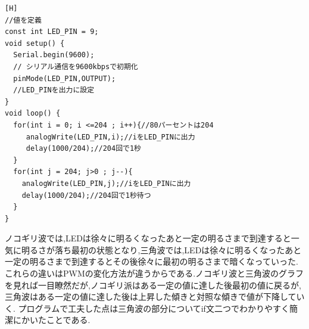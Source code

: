 \documentclass{jarticle}
\begin{document}
\begin{lstlisting}[caption=発展課題2.3.3三角波,label=code:hattenkadai2-3-3-sankaku][H]
//値を定義
const int LED_PIN = 9;
void setup() {
  Serial.begin(9600);
  // シリアル通信を9600kbpsで初期化
  pinMode(LED_PIN,OUTPUT);
  //LED_PINを出力に設定 
}
void loop() {
  for(int i = 0; i <=204 ; i++){//80パーセントは204
     analogWrite(LED_PIN,i);//iをLED_PINに出力
     delay(1000/204);//204回で1秒
  }
  for(int j = 204; j>0 ; j--){
    analogWrite(LED_PIN,j);//iをLED_PINに出力
    delay(1000/204);//204回で1秒待つ
  }
}
\end{lstlisting}
ノコギリ波では,LEDは徐々に明るくなったあと一定の明るさまで到達すると一気に明るさが落ち最初の状態となり,三角波では,LEDは徐々に明るくなったあと一定の明るさまで到達するとその後徐々に最初の明るさまで暗くなっていった.
これらの違いはPWMの変化方法が違うからである.ノコギリ波と三角波のグラフを見れば一目瞭然だが,ノコギリ派はある一定の値に達した後最初の値に戻るが,三角波はある一定の値に達した後は上昇した傾きと対照な傾きで値が下降していく.
プログラムで工夫した点は三角波の部分についてif文二つでわかりやすく簡潔にかいたことである.
\end{document}
